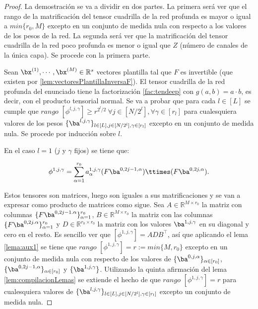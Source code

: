\begin{proof}

La demostración se va a dividir en dos partes. La primera será ver que el rango de la matrificación del tensor cuadrilla de la red profunda es mayor o igual a $\textit{min}\{r_0,M\}$ excepto en un conjunto de medida nula con respecto a los valores de los pesos de la red. La segunda será ver que la matrificación del tensor cuadrilla de la red poco profunda es menor o igual que $Z$ (número de canales de la única capa). Se procede con la primera parte.

Sean $\bx^{(1)},\cdots ,\bx^{(M)}\in \mathbb{R}^s$ vectores plantilla tal que $F$ es invertible (que existen por \ref{lem:vectoresPlantillaInversaF}). El tensor cuadrilla de la red profunda del enunciado tiene la factorización \ref{fac:tendeep} con $g(a,b) = a \cdot b$, es decir, con el producto tensorial normal. Se va a probar que para cada $l\in [L]$ se cumple que $\textit{rango }[\phi^{l,j,\gamma}] \geq r^{2^l/2} \ \forall j\in [N/2^l],\forall \gamma \in [r_l]$ para cualesquiera valores de los pesos $\{\ba^{l,j,\gamma}\}_{l \in [L], j\in [N/2^l],\gamma \in [r_l]}$ excepto en un conjunto de medida nula. Se procede por inducción sobre $l$.

En el caso $l=1$ ($j$ y $\gamma$ fijos) se tiene que:

$$
\phi^{1,j,\gamma} = \sum_{\alpha = 1}^{r_0} a_{\alpha}^{1,j,\gamma} (F \ba^{0,2j-1,\alpha}) \ttimes (F\ba^{0,2j,\alpha}).
$$

Estos tensores son matrices, luego son iguales a sus matrificaciones y se van a expresar como producto de matrices como sigue. Sea $A\in \mathbb{R}^{M\times r_0}$ la matriz con columnas $\{F\ba^{0,2j-1.\alpha}\}_{\alpha=1}^{r_0}$, $B \in \mathbb{R}^{M\times r_0}$ la matriz con las columnas $
\{F\ba^{0,2j.\alpha}\}_{\alpha=1}^{r_0}$ y $D\in\mathbb{R}^{r_0\times r_0}$ la matriz con los valores $\ba^{1,j,\gamma}$ en su diagonal y cero en el resto. Es sencillo ver que $[\phi^{1,j,\gamma}] = ADB^\top$, así que aplicando el lema \ref{lema:aux1} se tiene que $\textit{rango }[\phi^{1,j,\gamma}] = r := \textit{min}\{M,r_0\}$ excepto en un conjunto de medida nula con respecto de los valores de $\{\ba^{0,j,\alpha}\}_{\alpha\in [r_0]}$, $\{\ba^{0,2j-1,\alpha}\}_{\alpha\in [r_0]}$ y $\{\ba^{1,j,\gamma}\}$. Utilizando la quinta afirmación del lema \ref{lem:compilacionLemas} se extiende el hecho de que  $\textit{rango }[\phi^{1,j,\gamma}] = r$ para cualesquiera valores de $\{\ba^{l,j,\gamma}\}_{l \in [L], j\in [N/2^l],\gamma \in [r_l]}$ excepto un conjunto de medida nula.


\end{proof}
